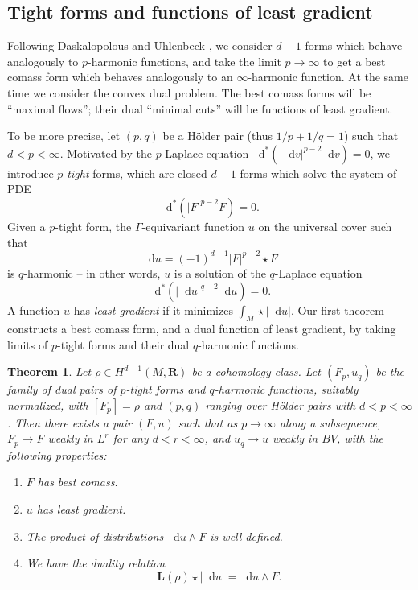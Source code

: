 \documentclass[reqno,11pt]{amsart}
\newcommand{\RR}{\mathbf{R}}
\newcommand*\dif{\mathop{}\!\mathrm{d}}
\newcommand{\Comass}{\mathbf L}
\newcommand{\dfn}[1]{\emph{#1}\index{#1}}
\newtheorem{mainthm}{Theorem}
\theoremstyle{definition}
\numberwithin{equation}{section}
\begin{document}
\subsection{Tight forms and functions of least gradient}
Following Daskalopolous and Uhlenbeck \cite{daskalopoulos2020transverse}, we consider $d - 1$-forms which behave analogously to $p$-harmonic functions, and take the limit $p \to \infty$ to get a best comass form which behaves analogously to an $\infty$-harmonic function.
At the same time we consider the convex dual problem.
The best comass forms will be ``maximal flows''; their dual ``minimal cuts'' will be functions of least gradient.

To be more precise, let $(p, q)$ be a H\"older pair (thus $1/p + 1/q = 1$) such that $d < p < \infty$.
Motivated by the $p$-Laplace equation $\dif^*(|\dif v|^{p - 2} \dif v) = 0$, we introduce \dfn{$p$-tight} forms, which are closed $d-1$-forms which solve the system of PDE
$$\dif^*(|F|^{p - 2} F) = 0.$$
Given a $p$-tight form, the $\Gamma$-equivariant function $u$ on the universal cover such that
$$\dif u = (-1)^{d - 1} |F|^{p - 2} \star F$$
is $q$-harmonic -- in other words, $u$ is a solution of the $q$-Laplace equation 
$$\dif^*(|\dif u|^{q - 2} \dif u) = 0.$$
A function $u$ has \dfn{least gradient} if it minimizes $\int_M \star |\dif u|$.
Our first theorem constructs a best comass form, and a dual function of least gradient, by taking limits of $p$-tight forms and their dual $q$-harmonic functions.

\begin{mainthm}\label{existence of infinity tight forms}
Let $\rho \in H^{d - 1}(M, \RR)$ be a cohomology class.
Let $(F_p, u_q)$ be the family of dual pairs of $p$-tight forms and $q$-harmonic functions, suitably normalized, with $[F_p] = \rho$ and $(p, q)$ ranging over H\"older pairs with $d < p < \infty$.
Then there exists a pair $(F, u)$ such that as $p \to \infty$ along a subsequence, $F_p \to F$ weakly in $L^r$ for any $d < r < \infty$, and $u_q \to u$ weakly in $BV$, with the following properties:
\begin{enumerate}
\item $F$ has best comass.
\item $u$ has least gradient.
\item The product of distributions $\dif u \wedge F$ is well-defined.
\item We have the duality relation
\begin{equation}\label{max flow mean cut}
\Comass(\rho) \star |\dif u| = \dif u \wedge F.
\end{equation}
\end{enumerate}
\end{mainthm}
\end{document}
